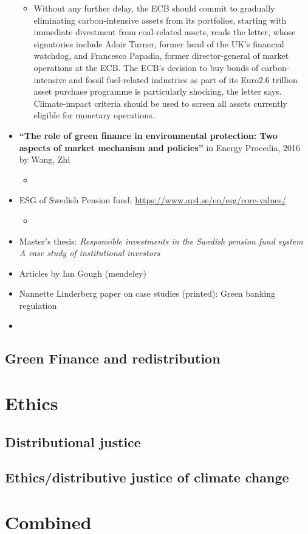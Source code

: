 \documentclass{article}
\begin{document}
\begin{itemize}
\begin{itemize}
	\item Without any further delay, the ECB should commit to gradually eliminating carbon-intensive assets from its portfolios, starting with immediate divestment from coal-related assets, reads the letter, whose signatories include Adair Turner, former head of the UK's financial watchdog, and Francesco Papadia, former director-general of market operations at the ECB.
	The ECB's decision to buy bonds of carbon-intensive and fossil fuel-related industries as part of its Euro2.6 trillion asset purchase programme is particularly shocking, the letter says. Climate-impact criteria should be used to screen all assets currently eligible for monetary operations.
	
\end{itemize}
\item \textbf{``The role of green finance in environmental protection: Two aspects of market mechanism and policies''} in Energy Procedia, 2016  by Wang, Zhi
\begin{itemize}
	\item 
\end{itemize}

\item  ESG of Swedish Pension fund: \url{https://www.ap4.se/en/esg/core-values/}
\begin{itemize}
\item 	
\end{itemize}
\item Master's thesis: \textit{Responsible investments in the Swedish pension fund system
A case study of institutional investors}
\item Articles by Ian Gough (mendeley)
\item Nannette Linderberg paper on case studies (printed): Green banking regulation
\item 
\end{itemize}
\subsection{Green Finance and redistribution}
\section{Ethics}
\subsection{Distributional justice}
\subsection{Ethics/distributive justice of climate change}
\section{Combined}
	
	\newpage
	
	
	
\end{document}
